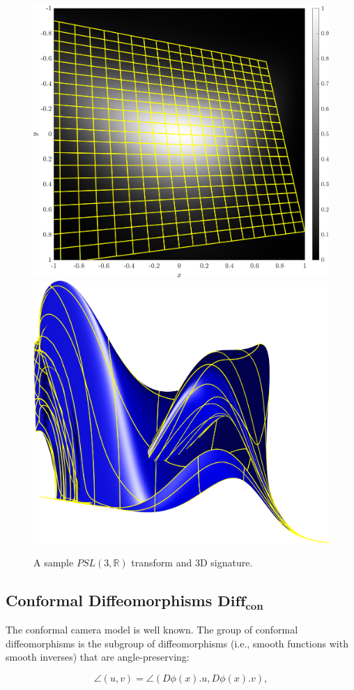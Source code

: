 \documentclass{artjlt}
\begin{document}

\begin{figure}
\centering
\includegraphics[width=.45\textwidth]{Figs/f_transformed_PSL3R.png}
\includegraphics[width=.45\textwidth]{Figs/PSL3R_signature.png}
\caption{A sample $PSL(3,\mathbb{R})$ transform and 3D signature.}
\label{fig:PSL3R}
\end{figure}

\subsection{Conformal Diffeomorphisms $\mathbf{Diff}_{\mathbf{con}}$}

The conformal camera model is well known. The group of conformal diffeomorphisms is the subgroup of diffeomorphisms (i.e., smooth functions with smooth inverses) that are angle-preserving:

\begin{equation}
\angle (u,v) = \angle (D \phi(x) . u, D \phi(x).v),
\end{equation}
\end{document}
